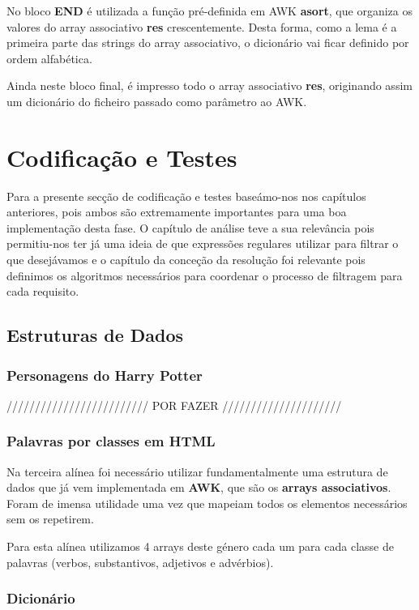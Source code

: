 \documentclass[11pt,a4paper]{report}
\begin{document}
No bloco \textbf{END} é utilizada a função pré-definida em AWK \textbf{asort}, que organiza os valores do array associativo \textbf{res} crescentemente. Desta forma, como a lema é a primeira parte das strings do array associativo, o dicionário vai ficar definido por ordem alfabética.

Ainda neste bloco final, é impresso todo o array associativo \textbf{res}, originando assim um dicionário do ficheiro passado como parâmetro ao AWK.


\chapter{Codificação e Testes}
\label{chap:codificacao}

Para a presente secção de codificação e testes baseámo-nos nos capítulos anteriores, pois ambos são extremamente importantes para uma boa implementação desta fase. O capítulo de análise teve a sua relevância pois permitiu-nos ter já uma ideia de que expressões regulares utilizar para filtrar o que desejávamos e o capítulo da conceção da resolução foi relevante pois definimos os algoritmos necessários para coordenar o processo de filtragem para cada requisito.

\section{Estruturas de Dados}

\subsection{Personagens do Harry Potter}
///////////////////////// POR FAZER /////////////////////

\subsection{Palavras por classes em HTML}

Na terceira alínea foi necessário utilizar fundamentalmente uma estrutura de dados que já vem implementada em \textbf{AWK}, que são os \textbf{arrays associativos}. Foram de imensa utilidade uma vez que mapeiam todos os elementos necessários sem os repetirem.

Para esta alínea utilizamos 4 arrays deste género cada um para cada classe de palavras (verbos, substantivos, adjetivos e advérbios).

\subsection{Dicionário}
\end{document}
